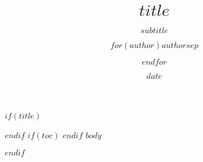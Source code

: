 \documentclass[nols, notitlepage, notoc]{tufte-handout}
\title{$title$}
\subtitle{$subtitle$}
\author{$for(author)$$author$$sep$ \and $endfor$}
\date{$date$}
\newlength{\fullwidthlength}
\begin{document}
$if(title)$
\noindent
\begin{minipage}{\fullwidthlength}
\maketitle
\end{minipage} 
$endif$
$if(toc)$
{
\hypersetup{linkcolor=black}
\setcounter{tocdepth}{$toc-depth$}
\tableofcontents
}
$endif$
$body$


$endif$
\end{document}
